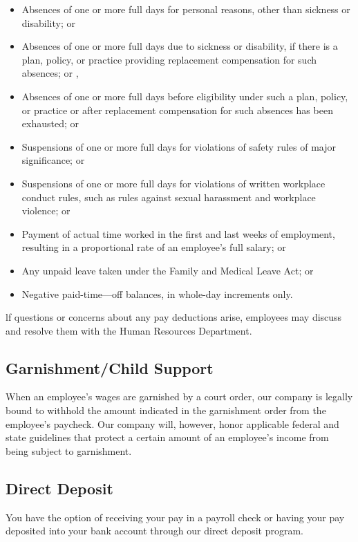 \documentclass{book}
\begin{document}
\begin{itemize} 
\item Absences of one or more full days for personal reasons, other than sickness or disability; or 
\item Absences of one or more full days due to sickness or disability, if there is a plan, policy, or practice providing replacement compensation for such absences; or , 
\item Absences of one or more full days before eligibility under such a plan, policy, or practice or after replacement compensation for such absences has been exhausted; or 
\item Suspensions of one or more full days for violations of safety rules of major significance; or 
\item Suspensions of one or more full days for violations of written workplace conduct rules, such as rules against sexual harassment and workplace violence; or 
\item Payment of actual time worked in the first and last weeks of employment, resulting in a proportional rate of an employee's full salary; or 
\item Any unpaid leave taken under the Family and Medical Leave Act; or 
\item Negative paid-time—off balances, in whole-day increments only. 
\end{itemize}

lf questions or concerns about any pay deductions arise, employees may discuss and resolve them with the Human Resources Department.

\subsection{Garnishment/Child Support}

When an employee's wages are garnished by a court order, our company is legally bound to withhold the amount indicated in the garnishment order from the employee's paycheck. Our company will, however, honor applicable federal and state guidelines that protect a certain amount of an employee's income from being subject to garnishment.

\subsection{Direct Deposit}

You have the option of receiving your pay in a payroll check or having your pay deposited into your bank account through our direct deposit program.
\end{document}
